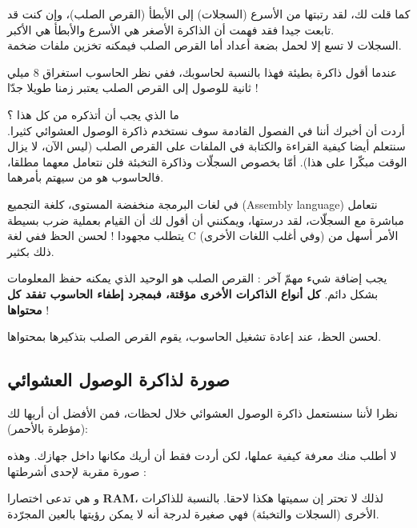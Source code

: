 كما قلت لك، لقد رتبتها من الأسرع (السجلات) إلى الأبطأ (القرص الصلب)، وإن كنت قد تابعت جيدا فقد فهمت أن الذاكرة الأصغر هي الأسرع والأبطأ هي الأكبر.\\
السجلات لا تسع إلا لحمل بضعة أعداد أما القرص الصلب فيمكنه تخزين ملفات ضخمة.

\begin{information}
   عندما أقول ذاكرة بطيئة فهذا بالنسبة لحاسوبك، ففي نظر الحاسوب استغراق 8 ميلي ثانية للوصول إلى القرص الصلب يعتبر زمنا طويلا جدّا !
\end{information}

ما الذي يجب أن أتذكره من كل هذا ؟\\
أردت أن أخبرك أننا في الفصول القادمة سوف نستخدم ذاكرة الوصول العشوائي كثيرا. سنتعلم أيضا كيفية القراءة والكتابة في الملفات على القرص الصلب (ليس الآن، لا يزال الوقت مبكّرا على هذا). أمّا بخصوص السجلّات وذاكرة التخبئة فلن نتعامل معهما مطلقا، فالحاسوب هو من سيهتم بأمرهما.

\begin{information}
  في لغات البرمجة منخفضة المستوى، كلغة التجميع
(\textenglish{Assembly language})
نتعامل مباشرة مع السجلّات، لقد درستها، ويمكنني أن أقول لك أن القيام بعملية ضرب بسيطة يتطلب مجهودا ! لحسن الحظ ففي لغة
\textenglish{C}
 (وفي أغلب اللغات الأخرى) الأمر أسهل من ذلك بكثير.
\end{information}

يجب إضافة شيء مهمّ آخر : القرص الصلب هو الوحيد الذي يمكنه حفظ المعلومات بشكل دائم.
\textbf{كل أنواع الذاكرات الأخرى مؤقتة، فبمجرد إطفاء الحاسوب تفقد كل محتواها} !

لحسن الحظ، عند إعادة تشغيل الحاسوب، يقوم القرص الصلب بتذكيرها بمحتواها.

\subsection{صورة لذاكرة الوصول العشوائي}

نظرا لأننا سنستعمل ذاكرة الوصول العشوائي خلال لحظات، فمن الأفضل أن أريها لك (مؤطرة بالأحمر):


لا أطلب منك معرفة كيفية عملها، لكن أردت فقط أن أريك مكانها داخل جهازك. وهذه صورة مقربة لإحدى أشرطتها :


و هي تدعى اختصارا
\textbf{\textenglish{RAM}}،
لذلك لا تحتر إن سميتها هكذا لاحقا. بالنسبة للذاكرات الأخرى (السجلات والتخبئة) فهي صغيرة لدرجة أنه لا يمكن رؤيتها بالعين المجرّدة.

